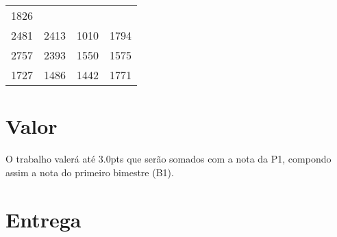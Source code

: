 \documentclass[a4paper]{article}
\begin{document}
\begin{longtable}[c]{@{}cccc@{}}
\begin{minipage}[t]{0.06\columnwidth}
1826
\strut\end{minipage}\tabularnewline
\begin{minipage}[t]{0.06\columnwidth}\centering\strut
2481
\strut\end{minipage} &
\begin{minipage}[t]{0.06\columnwidth}\centering\strut
2413
\strut\end{minipage} &
\begin{minipage}[t]{0.06\columnwidth}\centering\strut
1010
\strut\end{minipage} &
\begin{minipage}[t]{0.06\columnwidth}\centering\strut
1794
\strut\end{minipage}\tabularnewline
\begin{minipage}[t]{0.06\columnwidth}\centering\strut
2757
\strut\end{minipage} &
\begin{minipage}[t]{0.06\columnwidth}\centering\strut
2393
\strut\end{minipage} &
\begin{minipage}[t]{0.06\columnwidth}\centering\strut
1550
\strut\end{minipage} &
\begin{minipage}[t]{0.06\columnwidth}\centering\strut
1575
\strut\end{minipage}\tabularnewline
\begin{minipage}[t]{0.06\columnwidth}\centering\strut
1727
\strut\end{minipage} &
\begin{minipage}[t]{0.06\columnwidth}\centering\strut
1486
\strut\end{minipage} &
\begin{minipage}[t]{0.06\columnwidth}\centering\strut
1442
\strut\end{minipage} &
\begin{minipage}[t]{0.06\columnwidth}\centering\strut
1771
\strut\end{minipage}\tabularnewline
\bottomrule
\end{longtable}

\section{Valor}
O trabalho valerá até $3.0$pts que serão somados com a nota da P1, compondo assim a nota do primeiro bimestre (B1).

\section{Entrega}
\end{document}
